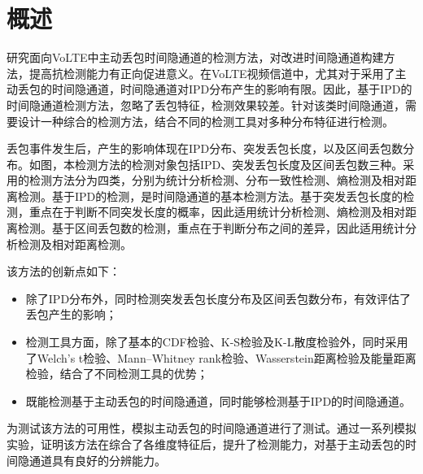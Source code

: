 \section{概述}
\label{chap:analyze:overview}

研究面向VoLTE中主动丢包时间隐通道的检测方法，对改进时间隐通道构建方法，提高抗检测能力有正向促进意义。在VoLTE视频信道中，尤其对于采用了主动丢包的时间隐通道，时间隐通道对IPD分布产生的影响有限。因此，基于IPD的时间隐通道检测方法，忽略了丢包特征，检测效果较差。针对该类时间隐通道，需要设计一种综合的检测方法，结合不同的检测工具对多种分布特征进行检测。


丢包事件发生后，产生的影响体现在IPD分布、突发丢包长度，以及区间丢包数分布。如图，本检测方法的检测对象包括IPD、突发丢包长度及区间丢包数三种。采用的检测方法分为四类，分别为统计分析检测、分布一致性检测、熵检测及相对距离检测。基于IPD的检测，是时间隐通道的基本检测方法。基于突发丢包长度的检测，重点在于判断不同突发长度的概率，因此适用统计分析检测、熵检测及相对距离检测。基于区间丢包数的检测，重点在于判断分布之间的差异，因此适用统计分析检测及相对距离检测。

该方法的创新点如下：
\begin{itemize}
	\item 除了IPD分布外，同时检测突发丢包长度分布及区间丢包数分布，有效评估了丢包产生的影响；
	\item 检测工具方面，除了基本的CDF检验、K-S检验及K-L散度检验外，同时采用了Welch's t检验、Mann–Whitney rank检验、Wasserstein距离检验及能量距离检验，结合了不同检测工具的优势；
	\item 既能检测基于主动丢包的时间隐通道，同时能够检测基于IPD的时间隐通道。
\end{itemize}

为测试该方法的可用性，模拟主动丢包的时间隐通道进行了测试。通过一系列模拟实验，证明该方法在综合了各维度特征后，提升了检测能力，对基于主动丢包的时间隐通道具有良好的分辨能力。